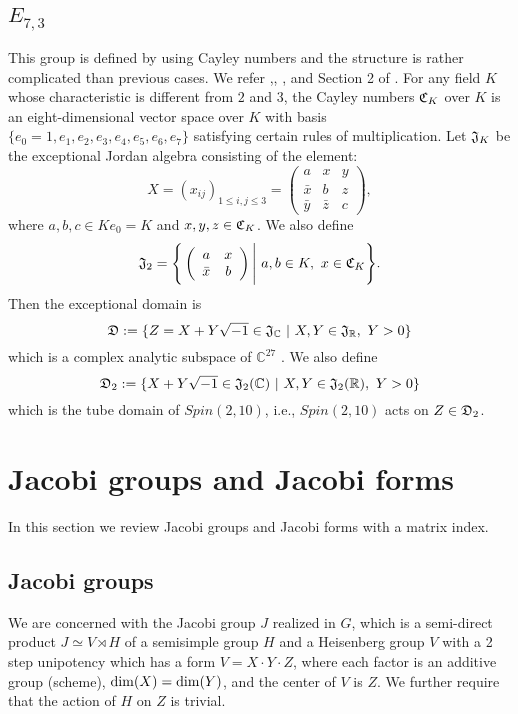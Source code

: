 \documentclass[11pt]{amsart}
\numberwithin{equation}{section}
\theoremstyle{definition}
\begin{document}
\subsection{$E_{7,3}$} This group is defined by using Cayley numbers and the structure is
rather complicated than previous cases.  We refer \cite{B},\cite{Coxeter}, \cite{kim}, and
Section 2 of \cite{KY}.
For any field $K$ whose characteristic is different from $2$ and $3$,
the Cayley numbers $\frak C_K$ over $K$ is an eight-dimensional vector space over $K$ with basis
$\{e_0=1,e_1,e_2,e_3,e_4,e_5,e_6,e_7\}$ satisfying certain rules of multiplication.
Let $\frak J_K$ be the exceptional Jordan algebra consisting of the element:
\begin{equation*}\label{x}
X=(x_{ij})_{1\le i,j\le 3}=\left(\begin{array}{ccc}
a& x & y \\
\bar{x} & b & z \\
\bar{y}& \bar{z} & c
\end{array}\right),
\end{equation*}
where $a,b,c\in Ke_0=K$ and $x,y,z\in \frak C_K$.
We also define
$$\frak J_2=\Bigg\{\left(\begin{array}{cc}
a& x  \\
\bar{x} & b
\end{array}\right) \Bigg|\ a,b\in K, \ x\in \frak C_K  \Bigg\}.
$$
Then the exceptional domain is
$$\frak D:=\{Z=X+Y\sqrt{-1}\in \frak J_{\mathbb{C}}\ |\ X,Y\in \frak J_{\mathbb{R}},\ Y>0\}$$
which is a complex analytic subspace of ${\mathbb{C}}^{27}$ . We also define
$$\frak D_2:=\{X+Y\sqrt{-1}\in \frak J_2({\mathbb{C}})\ |\ X,Y\in \frak J_2({\mathbb{R}}),\ Y>0\}
$$
which is the tube domain of $Spin(2,10)$, i.e., $Spin(2,10)$ acts on $Z\in \frak D_2$.

\section{Jacobi groups and Jacobi forms}
In this section we review Jacobi groups and Jacobi forms with a matrix index.

\subsection{Jacobi groups}
We are concerned with the Jacobi group $J$ realized in $G$, which is a semi-direct product
$J \simeq V\rtimes H$ of a semisimple group $H$ and a Heisenberg group $V$ with a 2 step unipotency which has a form
$V=X\cdot Y\cdot Z$, where each factor is an additive group (scheme), ${\rm dim}(X)={\rm dim}(Y)$, and
the center of $V$ is $Z$. We further require that the action of $H$ on $Z$ is trivial.
\end{document}
